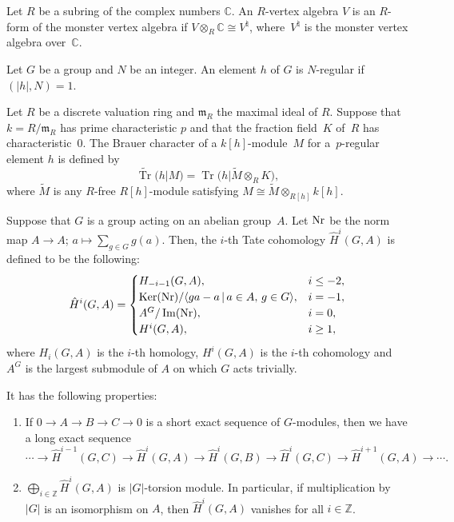 \documentclass[10pt,a4paper]{amsart}
\numberwithin{equation}{section}
\begin{document}
\begin{Definition}Let $R$ be a subring of the complex numbers $\mathbb{C}$. An $R$-vertex algebra $V$ is an $R$-form of the monster vertex algebra if $V\otimes_R\mathbb{C}\cong V^\natural$, where~$V^\natural$ is the monster vertex algebra over~$\mathbb{C}$.
\end{Definition}

\begin{Definition}
Let $G$ be a group and $N$ be an integer. An element $h$ of $G$ is $N$-regular if $(|h|,N)=1$.
\end{Definition}

\begin{Definition}
Let $R$ be a discrete valuation ring and $\mathfrak{m}_R$ the maximal ideal of $R$. Suppose that $k=R/\mathfrak{m}_R$ has prime characteristic $p$ and that the fraction field~$K$ of~$R$ has characteristic~$0$. The Brauer character of a $k[h]$-module~$M$ for a~$p$-regular element $h$ is defined by
\[
\widetilde{\operatorname{Tr}}(h|M)=\operatorname{Tr}\big(h|\widetilde{M}\otimes_RK\big),
\]
 where $\widetilde{M}$ is any $R$-free $R[h]$-module satisfying $M\cong\widetilde{M}\otimes_{R[h]}k[h]$.
\end{Definition}

\begin{Definition}[{\cite[Chapter IV]{CF}}]\label{Tate}
Suppose that $G$ is a group acting on an abelian group~$A$. Let ${\rm Nr}$ be the norm map $A\rightarrow A$; $a\mapsto\sum_{g\in G}{g(a)}$. Then, the $i$-th Tate cohomology ${\hat{H}}^i(G,A)$ is defined to be the following:
 \[
{\hat{H}}^i(G,A)= \begin{cases}
H_{-i-1}(G,A), & i\leq-2, \\
\operatorname{Ker}({\rm Nr})/\langle ga-a\,|\,a \in A, \, g\in G\rangle, & i=-1, \\
A^G/\operatorname{Im}({\rm Nr}), & i=0, \\
H^i(G,A), & i \geq1,
 \end{cases}
 \]
where $H_i(G,A)$ is the $i$-th homology, $H^i(G,A)$ is the $i$-th cohomology and $A^G$ is the largest submodule of $A$ on which $G$ acts trivially.
\end{Definition}

It has the following properties:
\begin{enumerate}\itemsep=0pt
\item[(1)] If $0\rightarrow A \rightarrow B \rightarrow C \rightarrow 0$ is a short exact sequence of $G$-modules, then we have a long exact sequence
\[
\cdots \rightarrow {\hat{H}}^{i-1}(G,C)\rightarrow {\hat{H}}^{i}(G,A)\rightarrow {\hat{H}}^{i}(G,B)\rightarrow {\hat{H}}^{i}(G,C)\rightarrow {\hat{H}}^{i+1}(G,A) \rightarrow \cdots.
\]
\item[(2)] $\bigoplus_{i\in \mathbb{Z}}{\hat{H}}^i(G,A)$ is $ |G |$-torsion module. In particular, if multiplication by $|G|$ is an isomorphism on $A$, then $\hat{H}^i(G,A)$ vanishes for all $i\in \mathbb{Z}$.
\end{enumerate}
\end{document}
